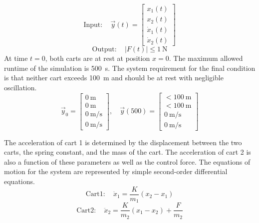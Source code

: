 \documentclass[submit]{aiaa-tc}%
\begin{document}
\begin{displaymath}
\mathrm{Input:}\quad \vec{y}(t)=
\begin{bmatrix}
x_{1}(t)\\
x_{2}(t)\\
\dot{x}_{1}(t)\\
\dot{x}_{2}(t)
\end{bmatrix}
\end{displaymath}
\begin{displaymath}
\mathrm{Output:}\quad
|F(t)|\le \SI{1}{\newton}
\end{displaymath}
At time $t=0$, both carts are at rest at position $x=0$. The maximum allowed runtime of the simulation is \SI{500}{\second}. The system requirement for the final condition is that neither cart exceeds \SI{100}{\metre} and should be at rest with negligible oscillation.
\begin{displaymath}
\vec{y}_0=\begin{bmatrix}
\SI{0}{\metre}\\\SI{0}{\metre}\\\SI{0}{\metre\per\second}\\\SI{0}{\metre\per\second}
\end{bmatrix},\quad
\vec{y}(500)=\begin{bmatrix}
<\SI{100}{\metre}\\ <\SI{100}{\metre}\\ \SI{0}{\metre\per\second}\\ \SI{0}{\metre\per\second}
\end{bmatrix}
\end{displaymath}

The acceleration of cart 1 is determined by the displacement between the two carts, the spring constant, and the mass of the cart. The acceleration of cart 2 is also a function of these parameters as well as the control force. The equations of motion for the system are represented by simple second-order differential equations.
\begin{equation}\label{e:cart1}
\mathrm{Cart 1:}\quad \ddot{x}_1=\frac{K}{m_1}(x_2-x_1)
\end{equation}
\begin{equation}\label{e:cart2}
\mathrm{Cart 2:}\quad \ddot{x}_2=\frac{K}{m_2}(x_1-x_2)+\frac{F}{m_2}
\end{equation}
\end{document}
